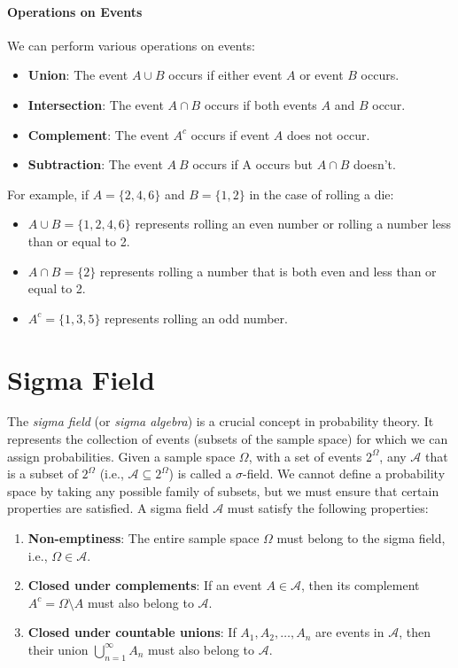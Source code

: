     \paragraph{Operations on Events}
    We can perform various operations on events:
    \begin{itemize}
        \item \textbf{Union}: The event $A \cup B$ occurs if either event $A$ or event $B$ occurs.
        \item \textbf{Intersection}: The event $A \cap B$ occurs if both events $A$ and $B$ occur.
        \item \textbf{Complement}: The event $A^c$ occurs if event $A$ does not occur.
        \item \textbf{Subtraction}: The event $A \ B$ occurs if A occurs but $A \cap B$ doesn't.
    \end{itemize}
    For example, if $A = \{2, 4, 6\}$ and $B = \{1, 2\}$ in the case of rolling a die:
    \begin{itemize}
        \item $A \cup B = \{1, 2, 4, 6\}$ represents rolling an even number or rolling a number less than or equal to 2.
        \item $A \cap B = \{2\}$ represents rolling a number that is both even and less than or equal to 2.
        \item $A^c = \{1, 3, 5\}$ represents rolling an odd number.
    \end{itemize}

    \section{Sigma Field}
    The \textit{sigma field} (or \textit{sigma algebra}) is a crucial concept in probability theory. It represents the collection of events (subsets of the sample space) for which we can assign probabilities. \newline
    Given a sample space $\Omega$, with a set of events $2^\Omega$, any $\mathcal{A}$ that is a subset of $2^\Omega$ (i.e., $\mathcal{A} \subseteq 2^\Omega$) is called a $\sigma$-field. We cannot define a probability space by taking any possible family of subsets, but we must ensure that certain properties are satisfied. \newline
    A sigma field $\mathcal{A}$ must satisfy the following properties:
    \begin{enumerate}
        \item \textbf{Non-emptiness}: The entire sample space $\Omega$ must belong to the sigma field, i.e., $\Omega \in \mathcal{A}$.
        \item \textbf{Closed under complements}: If an event $A \in \mathcal{A}$, then its complement $A^c = \Omega \setminus A$ must also belong to $\mathcal{A}$.
        \item \textbf{Closed under countable unions}: If $A_1, A_2, \dots, A_n$ are events in $\mathcal{A}$, then their union $\bigcup_{n=1}^{\infty} A_n$ must also belong to $\mathcal{A}$.
    \end{enumerate}

